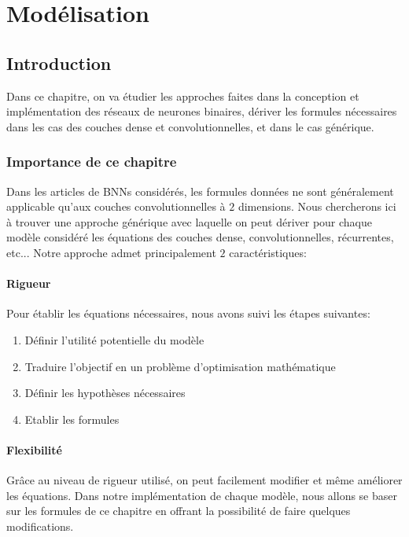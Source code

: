 \chapter{Modélisation}

\section{Introduction}

Dans ce chapitre, on va étudier les approches faites dans la conception et implémentation des réseaux de neurones binaires,  dériver les formules nécessaires dans les cas des couches dense et convolutionnelles, et dans le cas générique.

\subsection{Importance de ce chapitre}
Dans les articles de BNNs considérés, les formules données ne sont généralement applicable qu'aux couches convolutionnelles à $2$ dimensions.
\newline Nous chercherons ici à trouver une approche générique avec laquelle on peut dériver pour chaque modèle considéré les équations des couches dense, convolutionnelles, récurrentes, etc...
\newline Notre approche admet principalement $2$ caractéristiques:
\subsubsection{Rigueur}
Pour établir les équations nécessaires, nous avons suivi les étapes suivantes:
\begin{enumerate}
	\item Définir l'utilité potentielle du modèle
	\item Traduire l'objectif en un problème d'optimisation mathématique
	\item Définir les hypothèses nécessaires
	\item Etablir les formules
\end{enumerate}
\subsubsection{Flexibilité}
Grâce au niveau de rigueur utilisé, on peut facilement modifier et même améliorer les équations.
\newline Dans notre implémentation de chaque modèle, nous allons se baser sur les formules de ce chapitre en offrant la possibilité de faire quelques modifications.

